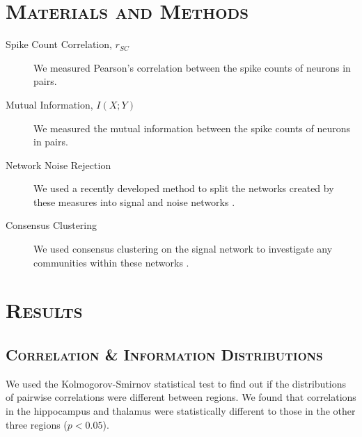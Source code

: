 \documentclass[a0,portrait]{a0poster}
\begin{document}
\begin{multicols}{2}


\section*{\color{NavyBlue}\textsc{Materials and Methods}\color{Black}}

\begin{description}
  \item[Spike Count Correlation, $r_{SC}$] We measured Pearson's correlation between the spike counts of neurons in pairs.
  \item[Mutual Information, $I(X;Y)$] We measured the mutual information between the spike counts of neurons in pairs.
  \item[Network Noise Rejection] We used a recently developed method to split the networks created by these measures into signal and noise networks \cite{humphries}.
  \item[Consensus Clustering] We used consensus clustering on the signal network to investigate any communities within these networks \cite{humphries}.
\end{description}


\section*{\color{NavyBlue}\textsc{Results}\color{Black}}

\subsection*{\color{NavyBlue}\textsc{Correlation \& Information Distributions}\color{Black}}

We used the Kolmogorov-Smirnov statistical test to find out if the distributions of pairwise correlations were different between regions. We found that correlations in the hippocampus and thalamus were statistically different to those in the other three regions ($p < 0.05$).


\end{multicols}
\end{document}
